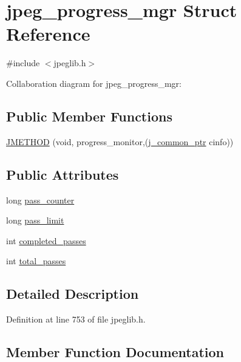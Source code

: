 \hypertarget{structjpeg__progress__mgr}{}\section{jpeg\+\_\+progress\+\_\+mgr Struct Reference}
\label{structjpeg__progress__mgr}


{\ttfamily \#include $<$jpeglib.\+h$>$}



Collaboration diagram for jpeg\+\_\+progress\+\_\+mgr\+:
\subsection*{Public Member Functions}
\begin{DoxyCompactItemize}
\item 
\mbox{\hyperlink{structjpeg__progress__mgr_aa6fbc36158dd82f586d752f976ad7fa3}{J\+M\+E\+T\+H\+OD}} (void, progress\+\_\+monitor,(\mbox{\hyperlink{jpeglib_8h_a1a177ab705cefea8f30ec31a48e62650}{j\+\_\+common\+\_\+ptr}} cinfo))
\end{DoxyCompactItemize}
\subsection*{Public Attributes}
\begin{DoxyCompactItemize}
\item 
long \mbox{\hyperlink{structjpeg__progress__mgr_ae52d1c89154d3f15ea44f96ee1c4ea7f}{pass\+\_\+counter}}
\item 
long \mbox{\hyperlink{structjpeg__progress__mgr_a68ec6ba74838f7b2b8ded8d4c8254c1d}{pass\+\_\+limit}}
\item 
int \mbox{\hyperlink{structjpeg__progress__mgr_a0cf4c1c84b2662763053e0eeaca417f3}{completed\+\_\+passes}}
\item 
int \mbox{\hyperlink{structjpeg__progress__mgr_a35d61747861f284526a9b312b3dc59ca}{total\+\_\+passes}}
\end{DoxyCompactItemize}


\subsection{Detailed Description}


Definition at line 753 of file jpeglib.\+h.



\subsection{Member Function Documentation}
\mbox{\label{structjpeg__progress__mgr_aa6fbc36158dd82f586d752f976ad7fa3}} 
